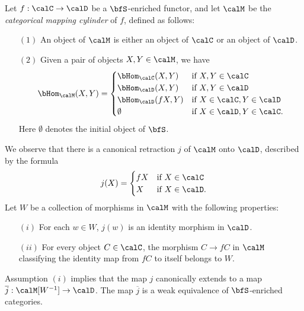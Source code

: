 \begin{lemma}\label{swimcase}
Let $f: \calC \rightarrow \calD$ be a $\bfS$-enriched functor, and let
$\calM$ be the {\it categorical mapping cylinder} of $f$, defined as follows:
\begin{itemize}
\item[$(1)$] An object of $\calM$ is either an object of $\calC$ or an object of $\calD$.
\item[$(2)$] Given a pair of objects $X,Y \in \calM$, we have
$$ \bHom_{\calM}(X,Y) = \begin{cases} \bHom_{\calC}(X,Y) & \text{if } X,Y \in \calC \\
\bHom_{\calD}( X,Y) & \text{if } X,Y \in \calD \\
\bHom_{\calD}( fX, Y) & \text{if } X \in \calC, Y \in \calD \\
\emptyset & \text{if } X \in \calD, Y \in \calC. \end{cases} $$
Here $\emptyset$ denotes the initial object of $\bfS$.
\end{itemize}
We observe that there is a canonical retraction $j$ of $\calM$ onto $\calD$, described by the formula $$j(X) = \begin{cases} fX & \text{if } X \in \calC \\
X & \text{if } X \in \calD. \end{cases}$$
Let $W$ be a collection of morphisms in $\calM$ with the following properties:
\begin{itemize}
\item[$(i)$] For each $w \in W$, $j(w)$ is an identity morphism in $\calD$.
\item[$(ii)$] For every object $C \in \calC$, the morphism $C \rightarrow fC$
in $\calM$ classifying the identity map from $fC$ to itself belongs to $W$.
\end{itemize}
Assumption $(i)$ implies that the map $j$ canonically extends to a map
$\overline{j}: \calM[W^{-1}] \rightarrow \calD$. The map $\overline{j}$
is a weak equivalence of $\bfS$-enriched categories.
\end{lemma}

